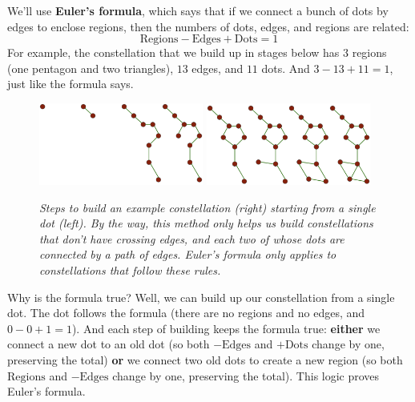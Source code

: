 \documentclass[openany, notitlepage, justified]{tufte-book}
\begin{document}
            We'll use \textbf{Euler's formula}, which says
            that if we connect a bunch of dots by edges to enclose
            regions, then the numbers of dots, edges, and regions are related:
            $$
                \text{Regions} - \text{Edges} + \text{Dots} = 1
            $$
            For example, the constellation that we build up in stages below
            has $3$ regions (one pentagon and two triangles), $13$ edges, and
            $11$ dots.  And $3-13+11 = 1$, just like the formula says.
            \begin{figure}[h!]
                \centering
                \includegraphics[height=2.7cm]{euler-a}
                \includegraphics[height=2.7cm]{euler-b}
                \caption{\emph{
                    Steps to build an example constellation (right) starting
                    from a single dot (left).
                    By the way, this method only helps us build constellations
                    that don't have crossing edges, and each two of whose dots
                    are connected by a path of edges.  Euler's formula only
                    applies to constellations that follow these rules.
                }}
            \end{figure}
            Why is the formula true?  Well, we can build up our constellation
            from a single dot.  The dot follows the formula
            (there are no regions and no edges, and $0-0+1 = 1$).  And
            each step of building keeps the formula true:
            \textbf{either} we connect a new dot to an old dot (so both
            $-\text{Edges}$ and $+\text{Dots}$ change by one, preserving the
            total)
            \textbf{or} we connect two old dots to create a new region (so both
            $\text{Regions}$ and $-\text{Edges}$ change by one, preserving the
            total).  This logic proves Euler's formula. 
\end{document}
